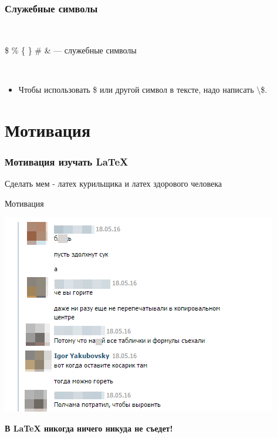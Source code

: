 \documentclass[newPxFont]{beamer}
\begin{document}

\begin{frame}
\frametitle{Служебные символы} 

\mbox{ } 

\centering
\Large{ \$ \% \{ \} \# \& --- служебные символы}

\mbox{ }

\begin{itemize}
\item \normalsize{Чтобы использовать \$ или другой символ в тексте, надо написать $\setminus$\$.}
\end{itemize}
\end{frame}


\section{Мотивация}

\begin{frame}\frametitle{Мотивация изучать \LaTeX{}} 
Сделать мем - латех курильщика и латех здорового человека
\end{frame}


\begin{frame}{Мотивация}

	\centering
    \includegraphics[height=0.7\textheight]{m1.png}
    
    
    \alert{\textbf{В \LaTeX{} никогда ничего никуда не съедет!}}
    
    
\end{frame}
\end{document}
